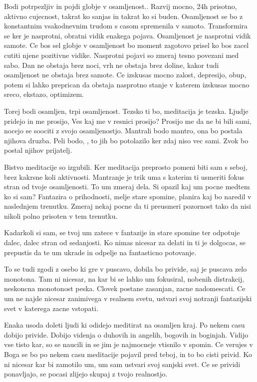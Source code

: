 Bodi potrpezljiv in pojdi globje v osamljenost.. Razvij mocno, 24h prisotno, aktivno cujecnost, takrat ko sanjas in takrat ko si buden. Osamljenost se bo z konstantnim vsakodnevnim trudom s casom spremenila v samoto. Transformira se ker je nasprotni, obratni vidik enakega pojava. Osamljenost je nasprotni vidik samote. Ce bos sel globje v osamljenost bo moment zagotovo prisel ko bos zacel cutiti njene pozitivne vidike. Nasprotni pojavi so zmeraj tesno povezani med sabo. Dan ne obstaja brez noci, vrh ne obstaja brez doline, kakor tudi osamljenost ne obstaja brez samote. Ce izskusas mocno zalost, depresijo, obup, potem si lahko preprican da obstaja nasprotno stanje v katerem izskusas mocno sreco, ekstazo, optimizem. 

Torej bodi osamljen, trpi osamljenost. Tezsko ti bo, meditacija je tezska. Ljudje pridejo in me prosijo,  Ves kaj me v resnici prosijo? Prosijo me da ne bi bili sami, nocejo se soociti z svojo osamljenostjo. Mantrali bodo mantro, ona bo postala njihova druzba. Peli bodo, , to jih bo potolazilo ker zdaj niso vec sami. Zvok  bo postal njihov prijatelj. 

Bistvo meditacije so izgubili. Ker meditacija preprosto pomeni biti sam s seboj, brez kakrsne koli aktivnosti. Mantranje je trik uma s katerim ti usmeriti fokus stran od tvoje osamljenosti. To um zmeraj dela. Si opazil kaj um pocne medtem ko si sam? Fantazira o prihodnosti, melje stare spomine, planira kaj bo naredil v naslednjem trenutku. Zmeraj nekaj pocne da ti preusmeri pozornost tako da nisi nikoli polno prisoten v tem trenutku. 

Kadarkoli si sam, se tvoj um zatece v fantazije in stare spomine ter odpotuje dalec, dalec stran od sedanjosti. Ko nimas nicesar za delati in ti je dolgocas, se prepustis da te um ukrade in odpelje na fantasticno potovanje. 

To se tudi zgodi z osebo ki gre v puscavo, dobila bo privide, saj je puscava zelo monotona. Tam ni nicesar, na kar bi se lahko um fokusiral, nobenih distrakcij, neskoncna monotonost peska. Clovek postane zasanjan, zacne nadomescati. Ce um ne najde nicesar zanimivega v realnem svetu, ustvari svoj notranji fantazijski svet v katerega zacne vstopati. 

Enaka usoda doleti ljudi ki odidejo meditirat na osamljen kraj. Po nekem casu dobijo privide. Dobijo videnja o duhovih in angelih, bogovih in boginjah. Vidijo vse tisto kar, so se naucili in se jim je najmocneje vtisnilo v spomin. Ce verujes v Boga se bo po nekem casu meditacije pojavil pred teboj, in to bo cisti privid. Ko ni nicesar kar bi zamotilo um, um sam ustvari svoj sanjski svet. Ce se prividi ponavljajo, se pocasi zlijejo skupaj z tvojo realnostjo. 

